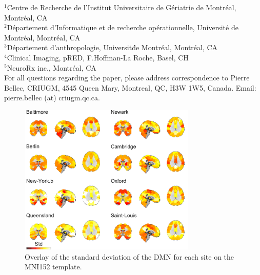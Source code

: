 \documentclass[authoryear]{elsarticle}
\begin{document}
$^1$Centre de Recherche de l'Institut Universitaire de G\'eriatrie de Montr\'eal, Montr\'eal, CA\\
$^2$D\'epartement d'Informatique et de recherche op\'erationnelle, Universit\'e de Montr\'eal, Montr\'eal, CA\\
$^3$D\'epartement d'anthropologie, Universit\' de Montr\'eal, Montr\'eal, CA\\
$^4$Clinical Imaging, pRED, F.Hoffman-La Roche, Basel, CH\\
$^5$NeuroRx inc., Montr\'eal, CA\\

For all questions regarding the paper, please address correspondence to Pierre Bellec, CRIUGM, 4545 Queen Mary, Montreal, QC, H3W 1W5, Canada. Email: pierre.bellec (at) criugm.qc.ca.\\


\begin{figure}[htbp]
\centering
\includegraphics[width=0.75\textwidth]{../figures/dmn_stdmultisite.pdf}
\caption[]{
Overlay of the standard deviation of the DMN for each site on the MNI152 template.
}
\label{fig_std_DMNs}
\end{figure}
\end{document}
